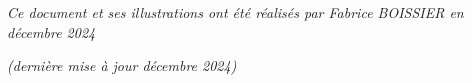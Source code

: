 \documentclass[11pt,a4paper]{article}
\begin{document}

\bigskip

\vfillFirst

\vfillLast

\begin{center}
\textit{Ce document et ses illustrations ont été réalisés par Fabrice BOISSIER en décembre 2024}

\textit{(dernière mise à jour décembre 2024)}
\end{center}
\end{document}
